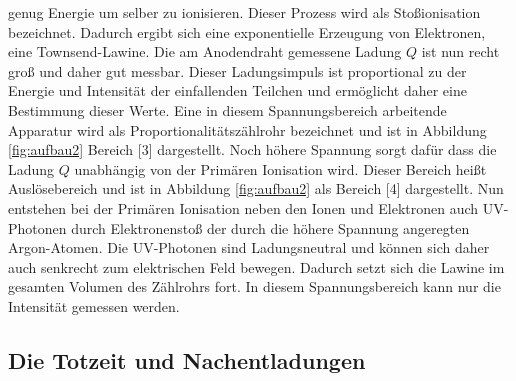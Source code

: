     genug Energie um selber zu ionisieren. Dieser Prozess wird als Stoßionisation bezeichnet. Dadurch
    ergibt sich eine exponentielle Erzeugung von Elektronen, eine Townsend-Lawine. Die am Anodendraht
    gemessene Ladung $Q$ ist nun recht groß und daher gut messbar. Dieser Ladungsimpuls ist
    proportional zu der Energie und Intensität der einfallenden Teilchen und ermöglicht daher eine
    Bestimmung dieser Werte. Eine in diesem Spannungsbereich arbeitende Apparatur wird als
    Proportionalitätszählrohr bezeichnet und ist in Abbildung \ref{fig:aufbau2} Bereich [3]
    dargestellt.
    Noch höhere Spannung sorgt dafür dass die Ladung $Q$ unabhängig von der Primären Ionisation wird.
    Dieser Bereich heißt Auslösebereich und ist in Abbildung \ref{fig:aufbau2} als Bereich [4]
    dargestellt. Nun entstehen bei der Primären Ionisation neben den Ionen und Elektronen auch
    UV-Photonen durch Elektronenstoß der durch die höhere Spannung angeregten Argon-Atomen. Die
    UV-Photonen sind Ladungsneutral und können sich daher auch senkrecht zum elektrischen Feld bewegen.
    Dadurch setzt sich die Lawine im gesamten Volumen des Zählrohrs fort. In diesem Spannungsbereich
    kann nur die Intensität gemessen werden.
  \subsection{Die Totzeit und Nachentladungen}
    
\label{sec:Theorie}
